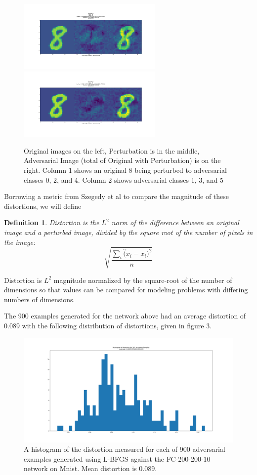 \documentclass[10pt]{extarticle}
\newtheorem{definition}[theorem]{Definition}
\newcounter{row}
\begin{document}
\begin{figure}[H]
\includegraphics[trim=200 185 100 200, clip,width=7cm]{2019-04-10-adverse/mnist_examples/FC200-200-10-2448-O8-A4-attack_summary.png}\includegraphics[trim=200 185 100 200, clip,width=7cm]{2019-04-10-adverse/mnist_examples/FC200-200-10-2448-O8-A5-attack_summary.png}
\caption{Original images on the left, Perturbation is in the middle, Adversarial Image (total of Original with Perturbation) is on the right. Column 1 shows an original 8 being perturbed to adversarial classes 0, 2, and 4. Column 2 shows adversarial classes 1, 3, and 5}
\end{figure}
Borrowing a metric from Szegedy et al to compare the magnitude of these distortions, we will define
\begin{definition}{Distortion is the $L^2$ norm of the difference between an original image and a perturbed image, divided by the square root of the number of pixels in the image: }
\[\sqrt{\dfrac{\sum_i \hat (x_i - x_i)^2}{n}}\]
\end{definition}
Distortion is $L^2$ magnitude normalized by the square-root of the number of dimensions so that values can be compared for modeling problems with differing numbers of dimensions. 

The 900 examples generated for the network above had an average distortion of 0.089 with the following distribution of distortions, given in figure 3.

\begin{figure}[H]
\label{lbfgsh}
\includegraphics[trim=200 80 100 100, clip, width=16cm]{2019-04-10-adverse/mnist_examples/FC200-200-10-distortion_hist.png}
\caption{A histogram of the distortion measured for each of 900 adversarial examples generated using L-BFGS against the FC-200-200-10 network on Mnist. Mean distortion is 0.089.}
\end{figure}
\end{document}
